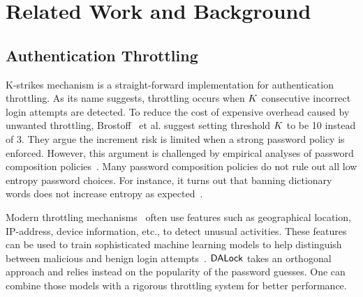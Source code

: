 

\section{Related Work and Background}\label{sec: relatedwork}


\subsection{Authentication Throttling} \label{related: Throttling}


 K-strikes mechanism is a straight-forward implementation for authentication throttling. As its name suggests, throttling occurs when $K$ consecutive incorrect login attempts are detected.  To reduce the cost of expensive overhead caused by unwanted throttling, Brostoff~\cite{brostoff2003ten} et al. suggest setting threshold $K$ to be 10 instead of 3. They argue the increment risk is limited when a strong password policy is enforced. However, this argument is challenged by empirical analyses of password composition policies~\cite{KSKMBCCE:SIGCHI11, BKPS:ACMEC13}. Many password composition policies do not rule out all low entropy password choices. For instance, it turns out that banning dictionary words does not increase entropy as expected~\cite{KSKMBCCE:SIGCHI11}.


 Modern throttling mechanisms~\cite{sandhu2005system, gordon2014efficiently} often use features such as geographical location, IP-address, device information, etc., to detect unusual activities. These features can be used to train sophisticated machine learning models to help distinguish between malicious and benign login attempts~\cite{NDSS:FJDBG16}. $\mathsf{DALock}$ takes an orthogonal approach and relies instead on the popularity of the password guesses. One can combine those models with a rigorous throttling system for better performance.


